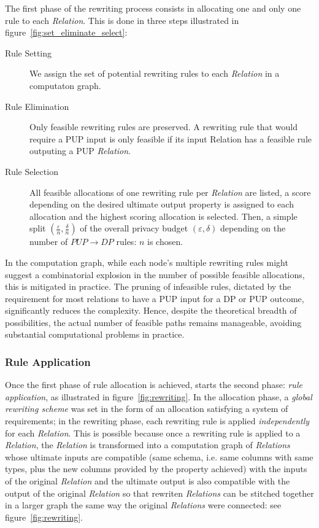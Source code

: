 \documentclass[letterpaper]{article} %
\begin{document}
The first phase of the rewriting process consists in allocating one and only one rule to each \emph{Relation}.
This is done in three steps illustrated in figure~\ref{fig:set_eliminate_select}:
\begin{description}
    \item[Rule Setting] We assign the set of potential rewriting rules to each \emph{Relation} in a computaton graph.
    \item[Rule Elimination] Only feasible rewriting rules are preserved. A rewriting rule that would require a PUP input is only feasible if its input Relation has a feasible rule outputing a PUP \emph{Relation}.
    \item[Rule Selection] All feasible allocations of one rewriting rule per \emph{Relation} are listed, a score depending on the desired ultimate output property is assigned to each allocation and the highest scoring allocation is selected. Then, a simple split $\left(\frac{\varepsilon}{n}, \frac{\delta}{n}\right)$ of the overall privacy budget $\left(\varepsilon, \delta\right)$ depending on the number of $PUP \rightarrow DP$ rules: $n$ is chosen.
\end{description}

In the computation graph, while each node's multiple rewriting rules might suggest a combinatorial explosion in the number of possible feasible allocations, this is mitigated in practice. The pruning of infeasible rules, dictated by the requirement for most relations to have a PUP input for a DP or PUP outcome, significantly reduces the complexity. Hence, despite the theoretical breadth of possibilities, the actual number of feasible paths remains manageable, avoiding substantial computational problems in practice.

\subsubsection{Rule Application}

Once the first phase of rule allocation is achieved, starts the second phase: \emph{rule application}, as illustrated in figure~\ref{fig:rewriting}.
In the allocation phase, a \emph{global rewriting scheme} was set in the form of an allocation satisfying a system of requirements; in the rewriting phase, each rewriting rule is applied \emph{independently} for each \emph{Relation}. This is possible because once a rewriting rule is applied to a \emph{Relation}, the \emph{Relation} is transformed into a computation graph of \emph{Relations} whose ultimate inputs are compatible (same schema, i.e. same columns with same types, plus the new columns provided by the property achieved) with the inputs of the original \emph{Relation} and the ultimate output is also compatible with the output of the original \emph{Relation} so that rewriten \emph{Relations} can be stitched together in a larger graph the same way the original \emph{Relations} were connected: see figure~\ref{fig:rewriting}.
\end{document}

